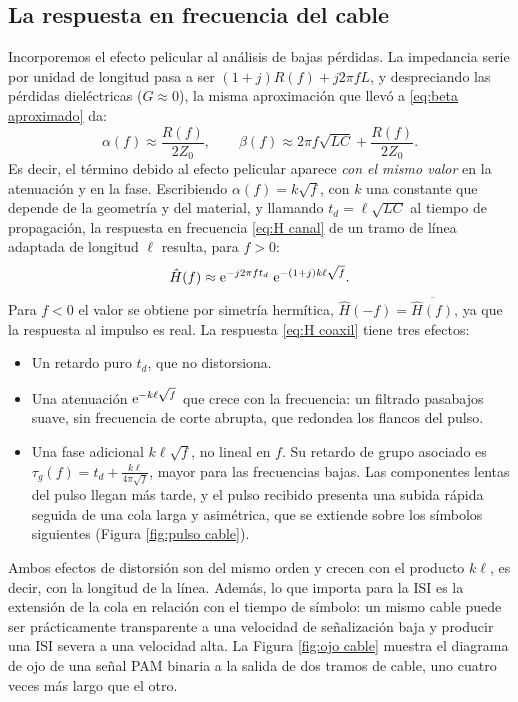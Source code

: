 \subsection*{La respuesta en frecuencia del cable}

Incorporemos el efecto pelicular al análisis de bajas pérdidas. La impedancia serie por unidad de longitud pasa a ser $(1+j)R(f) + j2\pi f L$, y despreciando las pérdidas dieléctricas ($G\approx 0$), la misma aproximación que llevó a \eqref{eq:beta aproximado} da:
\begin{equation}\label{eq:alpha combinado}
    \alpha(f) \approx \frac{R(f)}{2Z_0}, \qquad \beta(f) \approx 2\pi f\sqrt{LC} + \frac{R(f)}{2Z_0}.
\end{equation}
Es decir, el término debido al efecto pelicular aparece \emph{con el mismo valor} en la atenuación y en la fase. Escribiendo $\alpha(f)=k\sqrt f$, con $k$ una constante que depende de la geometría y del material, y llamando $t_d=\ell\sqrt{LC}$ al tiempo de propagación, la respuesta en frecuencia \eqref{eq:H canal} de un tramo de línea adaptada de longitud $\ell$ resulta, para $f>0$:
\begin{equation}\label{eq:H coaxil}
    \hat H(f) \approx \mathrm{e}^{-j2\pi f t_d}\;\mathrm{e}^{-(1+j)k\ell\sqrt{f}}.
\end{equation}
Para $f<0$ el valor se obtiene por simetría hermítica, $\hat H(-f)=\overline{\hat H(f)}$, ya que la respuesta al impulso es real. La respuesta \eqref{eq:H coaxil} tiene tres efectos:
\begin{itemize}
    \item Un retardo puro $t_d$, que no distorsiona.
    \item Una atenuación $\mathrm{e}^{-k\ell\sqrt f}$ que crece con la frecuencia: un filtrado pasabajos suave, sin frecuencia de corte abrupta, que redondea los flancos del pulso.
    \item Una fase adicional $k\ell\sqrt f$, no lineal en $f$. Su retardo de grupo asociado es $\tau_g(f)=t_d + \frac{k\ell}{4\pi\sqrt f}$, mayor para las frecuencias bajas. Las componentes lentas del pulso llegan más tarde, y el pulso recibido presenta una subida rápida seguida de una cola larga y asimétrica, que se extiende sobre los símbolos siguientes (Figura \ref{fig:pulso cable}).
\end{itemize}
Ambos efectos de distorsión son del mismo orden y crecen con el producto $k\ell$, es decir, con la longitud de la línea. Además, lo que importa para la ISI es la extensión de la cola en relación con el tiempo de símbolo: un mismo cable puede ser prácticamente transparente a una velocidad de señalización baja y producir una ISI severa a una velocidad alta. La Figura \ref{fig:ojo cable} muestra el diagrama de ojo de una señal PAM binaria a la salida de dos tramos de cable, uno cuatro veces más largo que el otro.

